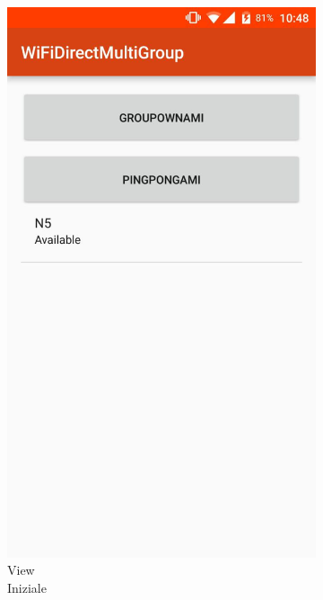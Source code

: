 \documentclass{llncs}
\begin{document}
\begin{figure}
	\centering
	\begin{subfigure}{.33\textwidth}
		\centering
		\includegraphics[width=.7\linewidth]{img/gui-init.jpg}
		\caption{View\\Iniziale}
		\label{fig:sub1}
	\end{subfigure}%
	\begin{subfigure}{.33\textwidth}
		\centering

\end{subfigure}
\end{figure}
\end{document}
